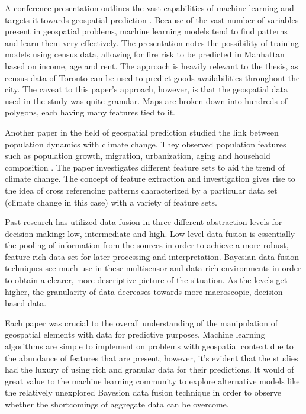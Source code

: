 \documentclass[12pt]{article}
\begin{document}
A conference presentation outlines the vast capabilities of machine learning and targets it towards geospatial prediction \cite{confpres}. Because of the vast number of variables present in geospatial problems, machine learning models tend to find patterns and learn them very effectively. The presentation notes the possibility of training models using census data, allowing for fire risk to be predicted in Manhattan based on income, age and rent. The approach is heavily relevant to the thesis, as census data of Toronto can be used to predict goods availabilities throughout the city. The caveat to this paper's approach, however, is that the geospatial data used in the study was quite granular. Maps are broken down into hundreds of polygons, each having many features tied to it. 

Another paper in the field of geospatial prediction studied the link between population dynamics with climate change. They observed population features such as population growth, migration, urbanization, aging and household composition \cite{popdyn}. The paper investigates different feature sets to aid the trend of climate change. The concept of feature extraction and investigation gives rise to the idea of cross referencing patterns characterized by a particular data set (climate change in this case) with a variety of feature sets. 

Past research has utilized data fusion in three different abstraction levels \cite{df1} for decision making: low, intermediate and high. Low level data fusion is essentially the pooling of information from the sources in order to achieve a more robust, feature-rich data set for later processing and interpretation. Bayesian data fusion techniques see much use in these multisensor and data-rich environments in order to obtain a clearer, more descriptive picture of the situation\cite{sf1}.  As the levels get higher, the granularity of data decreases towards more macroscopic, decision-based data. 

Each paper was crucial to the overall understanding of the manipulation of geospatial elements with data for predictive purposes. Machine learning algorithms are simple to implement on problems with geospatial context due to the abundance of features that are present; however, it's evident that the studies had the luxury of using rich and granular data for their predictions. It would of great value to the machine learning community to explore alternative models like the relatively unexplored Bayesion data fusion technique in order to observe whether the shortcomings of aggregate data can be overcome. 
\end{document}
